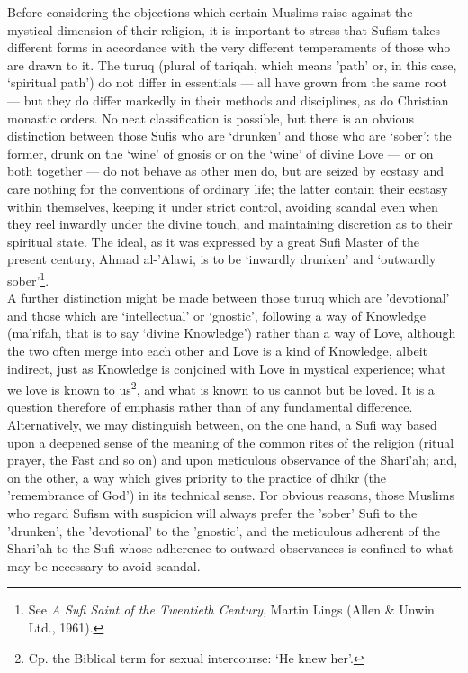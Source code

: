 \documentclass[10pt, twoside,openright]{book}
\begin{document}
Before considering the objections which certain Muslims raise against the mystical dimension of their 
religion, it is important to stress that Sufism takes different forms in accordance with the very 
different temperaments of those who are drawn to it. The turuq (plural of tariqah, which means 'path' 
or, in this case, `spiritual path') do not differ in essentials --- all have grown from the same root --- 
but they do differ markedly in their methods and disciplines, as do Christian monastic orders. No 
neat classification is possible, but there is an obvious distinction between those Sufis who are 
`drunken' and those who are `sober': the former, drunk on the `wine' of gnosis or on the `wine' of 
divine Love --- or on both together --- do not behave as other men do, but are seized by ecstasy and care 
nothing for the conventions of ordinary life; the latter contain their ecstasy within themselves, 
keeping it under strict control, avoiding scandal even when they reel inwardly under the divine 
touch, and maintaining discretion as to their spiritual state. The ideal, as it was expressed by a 
great Sufi Master of the present century, Ahmad al\hyp{}'Alawi, is to be `inwardly drunken' and `outwardly 
sober'\footnote{See \emph{A Sufi Saint of the Twentieth Century}, Martin Lings (Allen \& Unwin Ltd., 1961).}.\\

A further distinction might be made between those turuq which are 'devotional' and those which are 
`intellectual' or `gnostic', following a way of Knowledge (ma'rifah, that is to say `divine 
Knowledge') rather than a way of Love, although the two often merge into each other and Love is a 
kind of Knowledge, albeit indirect, just as Knowledge is conjoined with Love in mystical experience; 
what we love is known to us\footnote{Cp. the Biblical term for sexual intercourse: `He knew her'.}, and what is known to us cannot but be loved. It is a question 
therefore of emphasis rather than of any fundamental difference. \\

Alternatively, we may distinguish between, on the one hand, a Sufi way based upon a deepened sense of 
the meaning of the common rites of the religion (ritual prayer, the Fast and so on) and upon 
meticulous observance of the Shari'ah; and, on the other, a way which gives priority to the practice 
of dhikr (the 'remembrance of God') in its technical sense. For obvious reasons, those Muslims who 
regard Sufism with suspicion will always prefer the 'sober' Sufi to the 'drunken', the 'devotional' 
to the 'gnostic', and the meticulous adherent of the Shari'ah to the Sufi whose adherence to outward 
observances is confined to what may be necessary to avoid scandal. \\
\end{document}
